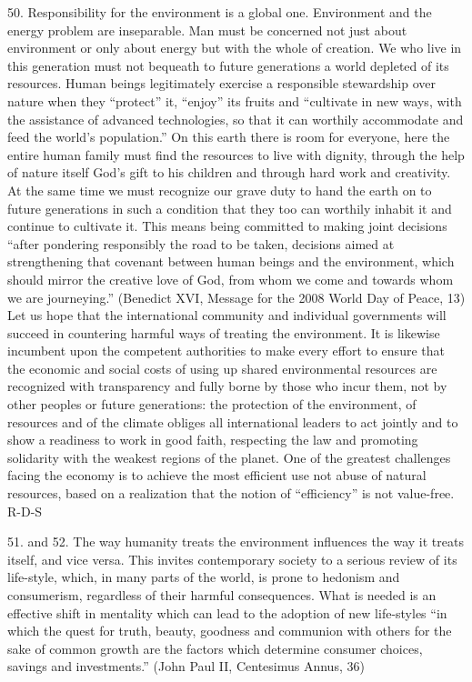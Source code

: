 \documentclass[oneside]{book}
\begin{document}
50. Responsibility for the environment is a global one. Environment and the
energy problem are inseparable. Man must be concerned not just about environment
or only about energy but with the whole of creation. We who live in this
generation must not bequeath to future generations a world depleted of its
resources. Human beings legitimately exercise a responsible stewardship over
nature when they ``protect'' it, ``enjoy'' its fruits and ``cultivate in new
ways, with the assistance of advanced technologies, so that it can worthily
accommodate and feed the world's population.'' On this earth there is room for
everyone, here the entire human family must find the resources to live with
dignity, through the help of nature itself  God's gift to his children  and
through hard work and creativity. At the same time we must recognize our grave
duty to hand the earth on to future generations in such a condition that they
too can worthily inhabit it and continue to cultivate it. This means being
committed to making joint decisions ``after pondering responsibly the road to be
taken, decisions aimed at strengthening that covenant between human beings and
the environment, which should mirror the creative love of God, from whom we come
and towards whom we are journeying.'' (Benedict XVI, Message for the 2008 World
Day of Peace, 13)
Let us hope that the international community and individual governments will
succeed in countering harmful ways of treating the environment. It is likewise
incumbent upon the competent authorities to make every effort to ensure that the
economic and social costs of using up shared environmental resources are
recognized with transparency and fully borne by those who incur them, not by
other peoples or future generations: the protection of the environment, of
resources and of the climate obliges all international leaders to act jointly
and to show a readiness to work in good faith, respecting the law and promoting
solidarity with the weakest regions of the planet. One of the greatest
challenges facing the economy is to achieve the most efficient use  not abuse
of natural resources, based on a realization that the notion of ``efficiency''
is not value-free.
R-D-S

51. and 52. The way humanity treats the environment influences the way it treats
itself, and vice versa. This invites contemporary society to a serious review of
its life-style, which, in many parts of the world, is prone to hedonism and
consumerism, regardless of their harmful consequences. What is needed is an
effective shift in mentality which can lead to the adoption of new life-styles
``in which the quest for truth, beauty, goodness and communion with others for
the sake of common growth are the factors which determine consumer choices,
savings and investments.'' (John Paul II, Centesimus Annus, 36)
\end{document}
